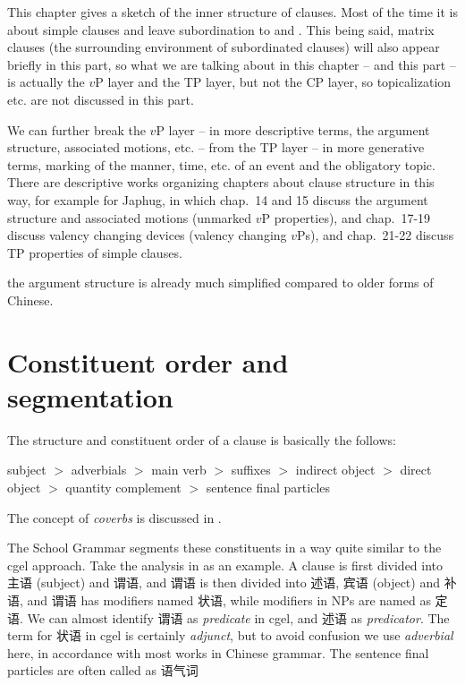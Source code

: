 \documentclass[../main.tex]{subfiles}
\begin{document}
This chapter gives a sketch of the inner structure of clauses.
Most of the time it is about simple clauses and leave subordination to 
 and .
This being said, matrix clauses (the surrounding environment of subordinated clauses)
will also appear briefly in this part, so what we are talking about in this chapter -- and this part -- is 
actually the $v$P layer and the TP layer, but not the CP layer, so topicalization etc. are not 
discussed in this part. 

We can further break the $v$P layer -- in more descriptive terms, the argument 
structure, associated motions, etc.
-- from the TP layer -- in more generative terms, marking of the manner, time, etc. of an event and the
obligatory topic. There are descriptive works organizing chapters about clause structure in this way, for example \citet{jacques2021grammar} for Japhug, in which chap.~14 and 15 discuss the argument structure and associated motions (unmarked $v$P properties), 
and chap.~17-19 discuss valency changing devices (valency changing $v$Ps), and chap.~21-22 discuss TP properties of simple clauses. 

the argument structure is already much simplified compared to older forms of Chinese.

\section{Constituent order and segmentation}

The structure and constituent order of a clause is basically the follows:
\begin{exe}
    \ex\label{ex:clause-order} subject $>$ adverbials $>$ main verb $>$ suffixes $>$ indirect object $>$ direct object $>$ quantity complement $>$ sentence final particles
\end{exe}
The concept of \emph{coverbs} is discussed in .

The School Grammar segments these constituents in a way quite similar to the \ac{cgel} approach. 
Take the analysis in \citet[chap. 5]{xianhan2004} as an example.
A clause is first divided into 主语 (subject) and 谓语, and 谓语 is then divided into 述语, 宾语 (object) and 补语,
and 谓语 has modifiers named 状语, while modifiers in NPs are named as 定语. We can almost identify 
谓语 as \emph{predicate} in \ac{cgel}, and 述语 as \emph{predicator}. 
The term for 状语 in \ac{cgel} is certainly \emph{adjunct}, but to avoid confusion we use \emph{adverbial}
here, in accordance with most works in Chinese grammar. 
The sentence final particles are often called as 语气词 %
\end{document}
